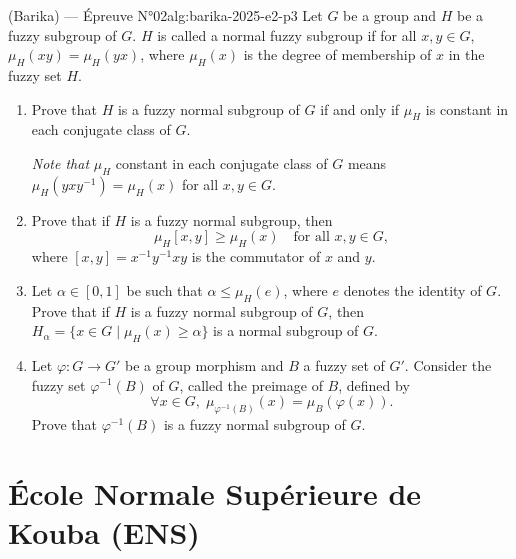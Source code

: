 \begin{problem}{(Barika) — Épreuve N°02}{alg:barika-2025-e2-p3}
Let $G$ be a group and $H$ be a fuzzy subgroup of $G$. $H$ is called a normal
fuzzy subgroup if for all $x, y \in G$, $\mu_H(xy) = \mu_H(yx)$, where $\mu_H(x)$
is the degree of membership of $x$ in the fuzzy set $H$.
\begin{enumerate}
\item Prove that $H$ is a fuzzy normal subgroup of $G$ if and only if $\mu_H$ is
      constant in each conjugate class of $G$.

      \emph{Note that} $\mu_H$ constant in each conjugate class of $G$ means
      $\mu_H(yxy^{-1}) = \mu_H(x)$ for all $x, y \in G$.
\item Prove that if $H$ is a fuzzy normal subgroup, then
      $$
      \mu_H[x, y] \geq \mu_H(x) \quad \text{for all } x, y \in G,
      $$
      where $[x, y] = x^{-1}y^{-1}xy$ is the commutator of $x$ and $y$.
\item Let $\alpha \in [0, 1]$ be such that $\alpha \leq \mu_H(e)$, where $e$ denotes
      the identity of $G$. Prove that if $H$ is a fuzzy normal subgroup of $G$, then
      $H_\alpha = \{x \in G \mid \mu_H(x) \geq \alpha\}$ is a normal subgroup of $G$.
\item Let $\varphi : G \to G'$ be a group morphism and $B$ a fuzzy set of $G'$.
      Consider the fuzzy set $\varphi^{-1}(B)$ of $G$, called the preimage of $B$,
      defined by
      $$
      \forall x \in G,\; \mu_{\varphi^{-1}(B)}(x) = \mu_B(\varphi(x)).
      $$
      Prove that $\varphi^{-1}(B)$ is a fuzzy normal subgroup of $G$.
\end{enumerate}

\end{problem}

\newpage

\section{École Normale Supérieure de Kouba (ENS)}

